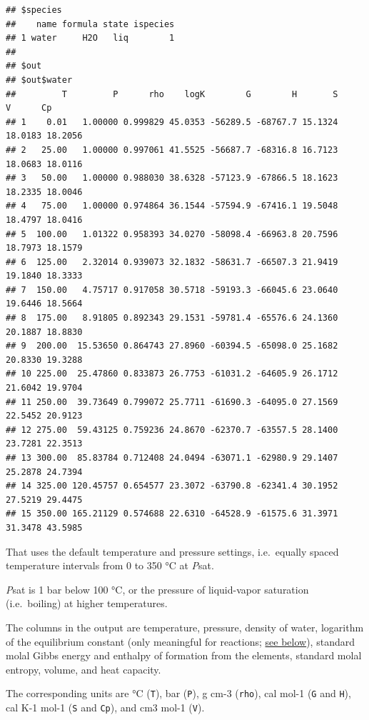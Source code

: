 \documentclass[]{tufte-book}
\begin{document}
\begin{verbatim}
## $species
##    name formula state ispecies
## 1 water     H2O   liq        1
## 
## $out
## $out$water
##         T         P      rho    logK        G        H       S       V      Cp
## 1    0.01   1.00000 0.999829 45.0353 -56289.5 -68767.7 15.1324 18.0183 18.2056
## 2   25.00   1.00000 0.997061 41.5525 -56687.7 -68316.8 16.7123 18.0683 18.0116
## 3   50.00   1.00000 0.988030 38.6328 -57123.9 -67866.5 18.1623 18.2335 18.0046
## 4   75.00   1.00000 0.974864 36.1544 -57594.9 -67416.1 19.5048 18.4797 18.0416
## 5  100.00   1.01322 0.958393 34.0270 -58098.4 -66963.8 20.7596 18.7973 18.1579
## 6  125.00   2.32014 0.939073 32.1832 -58631.7 -66507.3 21.9419 19.1840 18.3333
## 7  150.00   4.75717 0.917058 30.5718 -59193.3 -66045.6 23.0640 19.6446 18.5664
## 8  175.00   8.91805 0.892343 29.1531 -59781.4 -65576.6 24.1360 20.1887 18.8830
## 9  200.00  15.53650 0.864743 27.8960 -60394.5 -65098.0 25.1682 20.8330 19.3288
## 10 225.00  25.47860 0.833873 26.7753 -61031.2 -64605.9 26.1712 21.6042 19.9704
## 11 250.00  39.73649 0.799072 25.7711 -61690.3 -64095.0 27.1569 22.5452 20.9123
## 12 275.00  59.43125 0.759236 24.8670 -62370.7 -63557.5 28.1400 23.7281 22.3513
## 13 300.00  85.83784 0.712408 24.0494 -63071.1 -62980.9 29.1407 25.2878 24.7394
## 14 325.00 120.45757 0.654577 23.3072 -63790.8 -62341.4 30.1952 27.5219 29.4475
## 15 350.00 165.21129 0.574688 22.6310 -64528.9 -61575.6 31.3971 31.3478 43.5985
\end{verbatim}

That uses the default temperature and pressure settings, i.e.~equally
spaced temperature intervals from 0 to 350 °C at \emph{P}sat.

\begin{marginfigure}
\emph{P}sat is 1 bar below 100 °C, or the pressure of liquid-vapor
saturation (i.e.~boiling) at higher temperatures.
\end{marginfigure}

The columns in the output are temperature, pressure, density of water,
logarithm of the equilibrium constant (only meaningful for reactions;
\protect\hyperlink{properties-of-reactions}{see below}), standard molal
Gibbs energy and enthalpy of formation from the elements, standard molal
entropy, volume, and heat capacity.

\begin{marginfigure}
The corresponding units are °C (\texttt{T}), bar (\texttt{P}), g cm-3
(\texttt{rho}), cal mol-1 (\texttt{G} and \texttt{H}), cal K-1 mol-1
(\texttt{S} and \texttt{Cp}), and cm3 mol-1 (\texttt{V}).
\end{marginfigure}
\end{document}
